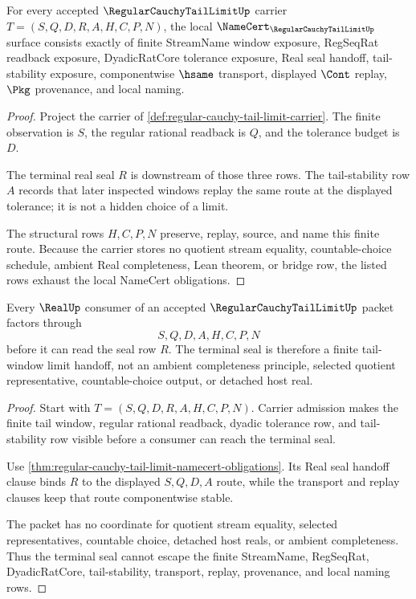 \begin{theorem}
\label{thm:regular-cauchy-tail-limit-namecert-obligations}
For every accepted $\RegularCauchyTailLimitUp$ carrier $T=(S,Q,D,R,A,H,C,P,N)$, the local $\NameCert_{\RegularCauchyTailLimitUp}$ surface consists exactly of finite StreamName window exposure, RegSeqRat readback exposure, DyadicRatCore tolerance exposure, Real seal handoff, tail-stability exposure, componentwise $\hsame$ transport, displayed $\Cont$ replay, $\Pkg$ provenance, and local naming.
\end{theorem}
\begin{proof}
Project the carrier of \autoref{def:regular-cauchy-tail-limit-carrier}. The finite observation is $S$, the regular rational readback is $Q$, and the tolerance budget is $D$.

The terminal real seal $R$ is downstream of those three rows. The tail-stability row $A$ records that later inspected windows replay the same route at the displayed tolerance; it is not a hidden choice of a limit.

The structural rows $H,C,P,N$ preserve, replay, source, and name this finite route. Because the carrier stores no quotient stream equality, countable-choice schedule, ambient Real completeness, Lean theorem, or bridge row, the listed rows exhaust the local NameCert obligations.
\end{proof}

\begin{theorem}
\label{thm:regular-cauchy-tail-limit-nonescape}
Every $\RealUp$ consumer of an accepted $\RegularCauchyTailLimitUp$ packet factors through
$$
S,Q,D,A,H,C,P,N
$$
before it can read the seal row $R$. The terminal seal is therefore a finite tail-window limit handoff, not an ambient completeness principle, selected quotient representative, countable-choice output, or detached host real.
\end{theorem}
\begin{proof}
Start with $T=(S,Q,D,R,A,H,C,P,N)$. Carrier admission makes the finite tail window, regular rational readback, dyadic tolerance row, and tail-stability row visible before a consumer can reach the terminal seal.

Use \autoref{thm:regular-cauchy-tail-limit-namecert-obligations}. Its Real seal handoff clause binds $R$ to the displayed $S,Q,D,A$ route, while the transport and replay clauses keep that route componentwise stable.

The packet has no coordinate for quotient stream equality, selected representatives, countable choice, detached host reals, or ambient completeness. Thus the terminal seal cannot escape the finite StreamName, RegSeqRat, DyadicRatCore, tail-stability, transport, replay, provenance, and local naming rows.
\end{proof}

